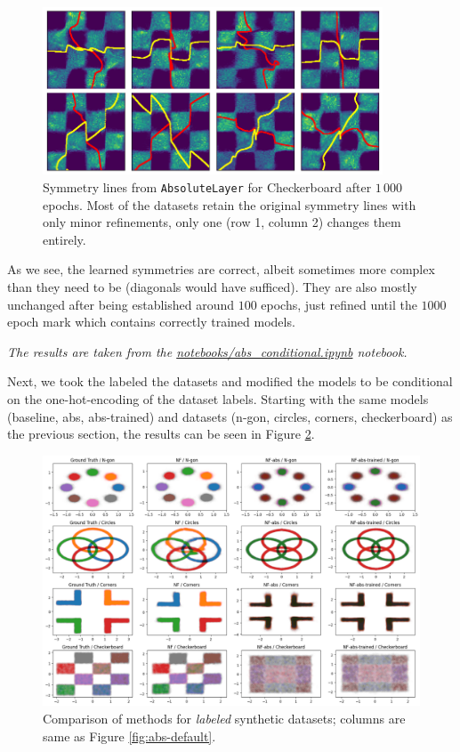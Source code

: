 \begin{figure}[H]
    \centering
    \includegraphics[width=0.9\textwidth]{images/synthetic/symmetry_lines/symmetry lines 4.png}
    \caption{Symmetry lines from \texttt{AbsoluteLayer} for Checkerboard after $1\,000$ epochs. Most of the datasets retain the original symmetry lines with only minor refinements, only one (row 1, column 2) changes them entirely.}
    \label{fig:symmetries_checkerboard_2}
\end{figure}

As we see, the learned symmetries are correct, albeit sometimes more complex than they need to be (diagonals would have sufficed).
They are also mostly unchanged after being established around $100$ epochs, just refined until the $1000$ epoch mark which contains correctly trained models. 


\textit{The results are taken from the \href{https://github.com/xiaoxiae/GNNFinal2024/blob/main/notebooks/abs\_conditional.ipynb}{notebooks/abs\_conditional.ipynb} notebook.}

Next, we took the labeled the datasets and modified the models to be conditional on the one-hot-encoding of the dataset labels.
Starting with the same models (baseline, abs, abs-trained) and datasets (n-gon, circles, corners, checkerboard) as the previous section, the results can be seen in Figure \ref{fig:abs-conditional}.

\begin{figure}[p]
    \centering
    \includegraphics[width=.85\linewidth]{images/synthetic/abs-conditional.png}
    \caption{Comparison of methods for \textit{labeled} synthetic datasets; columns are same as Figure \ref{fig:abs-default}.}
    \label{fig:abs-conditional}
\end{figure}

